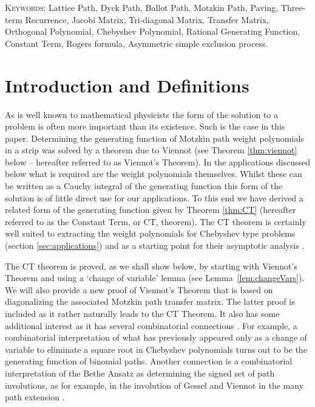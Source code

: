 \documentclass[11pt,a4paper]{article}
\begin{document}
 

\textsc{Keywords: } Lattice Path, Dyck Path, Ballot Path, Motzkin Path,  Paving, Three-term Recurrence, Jacobi Matrix, Tri-diagonal Matrix, Transfer Matrix, Orthogonal Polynomial, Chebyshev Polynomial, Rational Generating Function, Constant Term, Rogers formula, Asymmetric simple exclusion process.

\section{Introduction and Definitions} %

As is well known to mathematical physicists the form of the solution to a problem is often more important than its existence. Such is the case in this paper. Determining the generating  function of   Motzkin path weight polynomials in a strip was solved by a theorem  due to Viennot \cite{Viennot1985ah} (see Theorem \ref{thm:viennot} below -- hereafter referred to as Viennot's Theorem). In the applications discussed below what is required are the weight polynomials themselves. Whilst these can be written as a Cauchy integral of the generating function this form of the solution is of little direct use for our applications. To this end we have derived a  related form  of the generating function given by Theorem \ref{thm:CT} (hereafter referred to as the Constant Term, or CT, theorem).  The CT theorem  is certainly well suited to extracting the weight polynomials for Chebyshev type problems (section \ref{sec:applications}) and as a starting point for their asymptotic analysis \cite{owczarek:2008qe}.  

The CT theorem is  proved, as we shall show  below, by starting with Viennot's Theorem  and using a `change of variable' lemma (see Lemma~\ref{lem:changeVars}). We will  also provide a new   proof of Viennot's Theorem that is based on diagonalizing the associated Motzkin path transfer matrix. The latter proof is included as it rather naturally leads to the CT Theorem. It also has some additional interest as it has several combinatorial connections \cite{brak:2006kx}. For example, a combinatorial interpretation of what has previously appeared only as a change of variable to eliminate a square root in Chebyshev polynomials turns out to be the generating function of binomial paths. Another connection is a combinatorial interpretation of the Bethe Ansatz \cite{bethe31} as determining the signed set of path involutions,  as  for example, in the involution of Gessel and Viennot \cite{Gessel:gr} in the many path extension \cite{brak:1998un}.  
 
\end{document}
